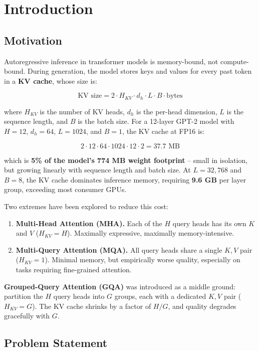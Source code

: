 
\section{Introduction}

\subsection{Motivation}

Autoregressive inference in transformer models is memory-bound, not 
compute-bound. During generation, the model stores keys and values for every 
past token in a \textbf{KV cache}, whose size is:

\[
\text{KV size} = 2 \cdot H_{KV} \cdot d_h \cdot L \cdot B \cdot \text{bytes}
\tag{1.1}
\]

where $H_{KV}$ is the number of KV heads, $d_h$ is the per-head dimension, 
$L$ is the sequence length, and $B$ is the batch size. For a 12-layer GPT-2 
model with $H = 12$, $d_h = 64$, $L = 1024$, and $B = 1$, the KV cache at 
FP16 is:

\[
2 \cdot 12 \cdot 64 \cdot 1024 \cdot 12 \cdot 2 = 37.7 \text{ MB}
\tag{1.2}
\]

which is \textbf{5\% of the model's 774 MB weight footprint} -- small in isolation, 
but growing linearly with sequence length and batch size. At $L = 32{,}768$ 
and $B = 8$, the KV cache dominates inference memory, requiring \textbf{9.6 GB} 
per layer group, exceeding most consumer GPUs.

Two extremes have been explored to reduce this cost:

\begin{enumerate}
\item \textbf{Multi-Head Attention (MHA).} Each of the $H$ query heads has its own
  $K$ and $V$ ($H_{KV} = H$). Maximally expressive, maximally memory-intensive.
\item \textbf{Multi-Query Attention (MQA).} All query heads share a single $K, V$
  pair ($H_{KV} = 1$). Minimal memory, but empirically worse quality,
  especially on tasks requiring fine-grained attention.

\end{enumerate}
\textbf{Grouped-Query Attention (GQA)} was introduced as a middle ground: partition 
the $H$ query heads into $G$ groups, each with a dedicated $K, V$ pair 
($H_{KV} = G$). The KV cache shrinks by a factor of $H / G$, and quality 
degrades gracefully with $G$.

\subsection{Problem Statement}

